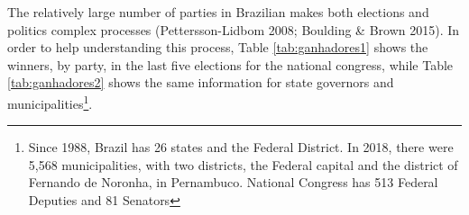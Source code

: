 \documentclass[
  12pt,
]{article}
\begin{document}
The relatively large number of parties in Brazilian makes both elections
and politics complex processes (Pettersson-Lidbom 2008; Boulding \&
Brown 2015). In order to help understanding this process, Table
\ref{tab:ganhadores1} shows the winners, by party, in the last five
elections for the national congress, while Table \ref{tab:ganhadores2}
shows the same information for state governors and
municipalities\footnote{Since 1988, Brazil has 26 states and the Federal
  District. In 2018, there were 5,568 municipalities, with two
  districts, the Federal capital and the district of Fernando de
  Noronha, in Pernambuco. National Congress has 513 Federal Deputies and
  81 Senators}.

\begin{table}[!h]

\caption{\label{tab:ganhadores1}Distribuition of winners by party in National Congress, 2002-2018}
\centering
{}
\end{table}
\end{document}
